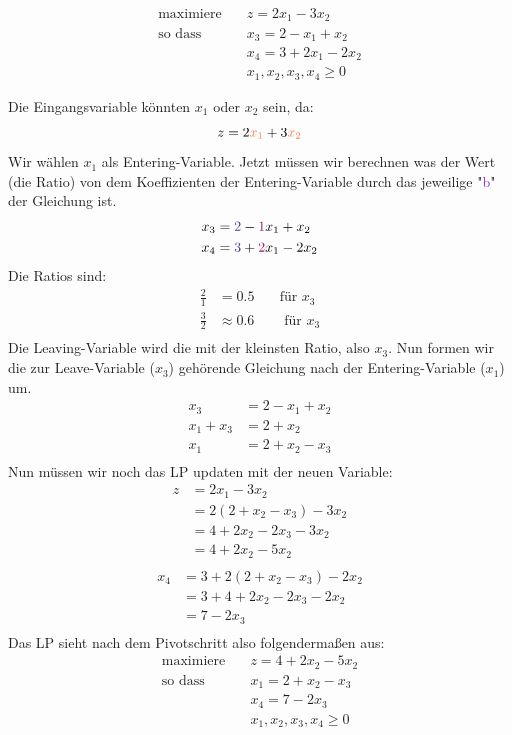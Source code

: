 \documentclass{article}
\begin{document}
\begin{align*}
    \text{maximiere} \quad & z = 2x_1 - 3x_2 \\
    \text{so dass} \quad & x_3 = 2 - x_1 + x_2 \\
                          & x_4 = 3 + 2x_1 - 2x_2 \\
                          & x_1, x_2, x_3, x_4 \geq 0
\end{align*}

Die Eingangsvariable könnten $x_1$ oder $x_2$ sein, da: 
\[ 
z = 2\textcolor{Peach}{x_1} + 3\textcolor{Peach}{x_2 }
\]
Wir wählen $x_1$ als Entering-Variable. \newline
Jetzt müssen wir berechnen was der Wert (die Ratio) von dem \textcolor{RedViolet}{Koeffizienten} der Entering-Variable durch das jeweilige "\textcolor{BlueViolet}{b}" der Gleichung ist. 
\begin{align*}
 x_3 &= \textcolor{BlueViolet}{2} - \textcolor{RedViolet}{1}x_1 + x_2 \\
x_4 & = \textcolor{BlueViolet}{3} + \textcolor{RedViolet}{2}x_1 - 2x_2 \\
\end{align*}
Die Ratios sind: 
\begin{align*}
    \frac{2}{1} &= 0.5 & \quad \text{für } x_3 \\
    \frac{3}{2} & \approx 0.6 & \quad  \text{ für } x_3 \\
\end{align*}
Die Leaving-Variable wird die mit der kleinsten Ratio, also $x_3$. \newline
Nun formen wir die zur Leave-Variable ($x_3$) gehörende Gleichung nach der Entering-Variable ($x_1$) um.
\begin{align*}
    x_3 &= 2 - x_1 + x_2 \\
    x_1 + x_3 &= 2 + x_2 \\
    x_1  &= 2 + x_2  - x_3 \\
\end{align*}
Nun müssen wir noch das LP updaten mit der neuen Variable:
\begin{align*}
    z &= 2x_1 - 3x_2 \\
    &= 2(2 + x_2  - x_3) - 3x_2 \\
    &= 4 + 2x_2  - 2x_3 - 3x_2 \\
    &= 4 + 2x_2  - 5x_2 \\
\end{align*}
\begin{align*}
     x_4 &= 3 + 2(2 + x_2  - x_3) - 2x_2 \\
     &= 3 + 4 + 2x_2  - 2x_3 - 2x_2 \\
     &= 7 - 2x_3 \\
\end{align*}
Das LP sieht nach dem Pivotschritt also folgendermaßen aus:
\begin{align*}
    \text{maximiere} \quad & z = 4 + 2x_2  - 5x_2 \\
    \text{so dass} \quad & x_1  = 2 + x_2  - x_3 \\
                          & x_4 = 7 - 2x_3 \\
                          & x_1, x_2, x_3, x_4 \geq 0
\end{align*}
\end{document}
